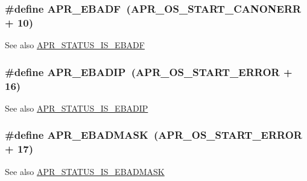 \subsubsection[{\texorpdfstring{A\+P\+R\+\_\+\+E\+B\+A\+DF}{APR_EBADF}}]{\setlength{\rightskip}{0pt plus 5cm}\#define A\+P\+R\+\_\+\+E\+B\+A\+DF~({\bf A\+P\+R\+\_\+\+O\+S\+\_\+\+S\+T\+A\+R\+T\+\_\+\+C\+A\+N\+O\+N\+E\+RR} + 10)}\hypertarget{group__APR__Error_ga204df8a37a5c7fd6b2c74ea098fbac02}{}\label{group__APR__Error_ga204df8a37a5c7fd6b2c74ea098fbac02}
\begin{DoxySeeAlso}{See also}
\hyperlink{group__APR__STATUS__IS_gaa843153a73806cca500287940e9f175f}{A\+P\+R\+\_\+\+S\+T\+A\+T\+U\+S\+\_\+\+I\+S\+\_\+\+E\+B\+A\+DF} 
\end{DoxySeeAlso}
\subsubsection[{\texorpdfstring{A\+P\+R\+\_\+\+E\+B\+A\+D\+IP}{APR_EBADIP}}]{\setlength{\rightskip}{0pt plus 5cm}\#define A\+P\+R\+\_\+\+E\+B\+A\+D\+IP~({\bf A\+P\+R\+\_\+\+O\+S\+\_\+\+S\+T\+A\+R\+T\+\_\+\+E\+R\+R\+OR} + 16)}\hypertarget{group__APR__Error_ga96180fb8075ae0150bfed50c2e7f7a59}{}\label{group__APR__Error_ga96180fb8075ae0150bfed50c2e7f7a59}
\begin{DoxySeeAlso}{See also}
\hyperlink{group__APR__STATUS__IS_ga02d9309a113e07050308af66e955d600}{A\+P\+R\+\_\+\+S\+T\+A\+T\+U\+S\+\_\+\+I\+S\+\_\+\+E\+B\+A\+D\+IP} 
\end{DoxySeeAlso}
\subsubsection[{\texorpdfstring{A\+P\+R\+\_\+\+E\+B\+A\+D\+M\+A\+SK}{APR_EBADMASK}}]{\setlength{\rightskip}{0pt plus 5cm}\#define A\+P\+R\+\_\+\+E\+B\+A\+D\+M\+A\+SK~({\bf A\+P\+R\+\_\+\+O\+S\+\_\+\+S\+T\+A\+R\+T\+\_\+\+E\+R\+R\+OR} + 17)}\hypertarget{group__APR__Error_ga5249b5edc27466f6b60b3dfa1541ba31}{}\label{group__APR__Error_ga5249b5edc27466f6b60b3dfa1541ba31}
\begin{DoxySeeAlso}{See also}
\hyperlink{group__APR__STATUS__IS_gabec95c93d0c5996f14a94e2cc37e1904}{A\+P\+R\+\_\+\+S\+T\+A\+T\+U\+S\+\_\+\+I\+S\+\_\+\+E\+B\+A\+D\+M\+A\+SK} 
\end{DoxySeeAlso}
